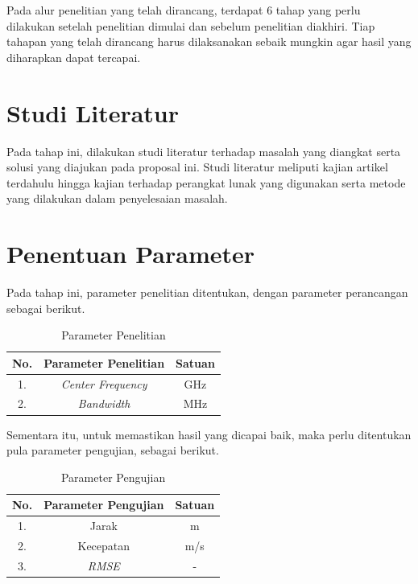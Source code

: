 Pada alur penelitian yang telah dirancang, terdapat 6 tahap yang perlu dilakukan setelah penelitian dimulai dan sebelum penelitian diakhiri. Tiap tahapan yang telah dirancang harus dilaksanakan sebaik mungkin agar hasil yang diharapkan dapat tercapai.


\section{Studi Literatur}
Pada tahap ini, dilakukan studi literatur terhadap masalah yang diangkat serta solusi yang diajukan pada proposal ini. Studi literatur meliputi kajian artikel terdahulu hingga kajian terhadap perangkat lunak yang digunakan serta metode yang dilakukan dalam penyelesaian masalah.
	
\section{Penentuan Parameter}

Pada tahap ini, parameter penelitian ditentukan, dengan parameter perancangan sebagai berikut.

\begin{center}
	\begin{longtable}{| c | c | c |}
		\caption{Parameter Penelitian}
		\label{tab:param}\\
		\hline
		No. & Parameter Penelitian 			& Satuan\\ \hline
		1.  &\textit{Center Frequency}	   	& GHz\\
		2.  &\textit{Bandwidth} 			& MHz \\
		\hline
	\end{longtable}
\end{center}

Sementara itu, untuk memastikan hasil yang dicapai baik, maka perlu ditentukan pula parameter pengujian, sebagai berikut.

\begin{center}
	\begin{longtable}{| c | c | c |}
		\caption{Parameter Pengujian}
		\label{tab:paramUji}\\
		\hline
		No. & Parameter Pengujian		& Satuan\\ \hline
		1.  &Jarak	   					& m\\
		2.  &Kecepatan 					& m/s\\
		3.  &\textit{RMSE}				& -\\
		\hline
	\end{longtable}
\end{center}


